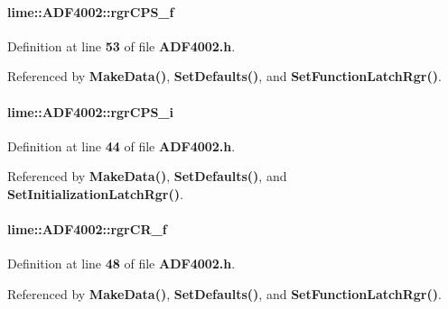\paragraph[{rgr\+C\+P\+S\+\_\+f}]{ lime\+::\+A\+D\+F4002\+::rgr\+C\+P\+S\+\_\+f}\label{classlime_1_1ADF4002_a0036a4e23da88abd39eab1b10430abe7}


Definition at line {\bf 53} of file {\bf A\+D\+F4002.\+h}.



Referenced by {\bf Make\+Data()}, {\bf Set\+Defaults()}, and {\bf Set\+Function\+Latch\+Rgr()}.

\paragraph[{rgr\+C\+P\+S\+\_\+i}]{ lime\+::\+A\+D\+F4002\+::rgr\+C\+P\+S\+\_\+i}\label{classlime_1_1ADF4002_a680e6dd7feff4e2af2e377302f8eee65}


Definition at line {\bf 44} of file {\bf A\+D\+F4002.\+h}.



Referenced by {\bf Make\+Data()}, {\bf Set\+Defaults()}, and {\bf Set\+Initialization\+Latch\+Rgr()}.

\paragraph[{rgr\+C\+R\+\_\+f}]{ lime\+::\+A\+D\+F4002\+::rgr\+C\+R\+\_\+f}\label{classlime_1_1ADF4002_ae0b72ee21371ef81592f8643c490b697}


Definition at line {\bf 48} of file {\bf A\+D\+F4002.\+h}.



Referenced by {\bf Make\+Data()}, {\bf Set\+Defaults()}, and {\bf Set\+Function\+Latch\+Rgr()}.

